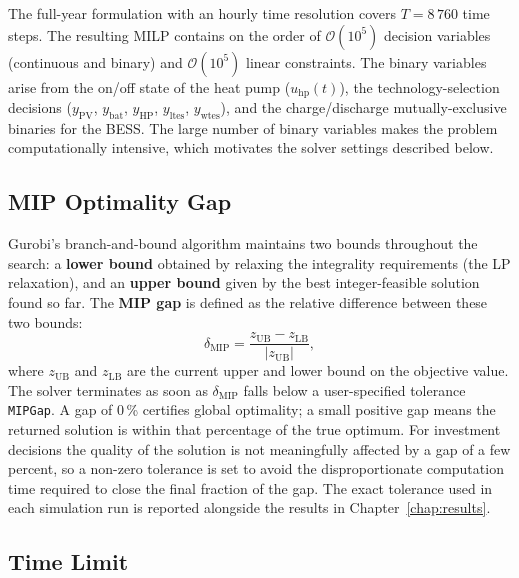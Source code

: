 \documentclass[11pt,a4paper]{report}
\begin{document}
The full-year formulation with an hourly time resolution covers $T = 8\,760$
time steps.
The resulting MILP contains on the order of $\mathcal{O}(10^5)$ decision
variables (continuous and binary) and $\mathcal{O}(10^5)$ linear constraints.
The binary variables arise from the on/off state of the heat pump ($u_\mathrm{hp}(t)$),
the technology-selection decisions ($y_\mathrm{PV}$, $y_\mathrm{bat}$,
$y_\mathrm{HP}$, $y_\mathrm{ltes}$, $y_\mathrm{wtes}$), and the
charge/discharge mutually-exclusive binaries for the BESS.
The large number of binary variables makes the problem computationally intensive,
which motivates the solver settings described below.

\subsection*{MIP Optimality Gap}

Gurobi's branch-and-bound algorithm maintains two bounds throughout the
search: a \textbf{lower bound} obtained by relaxing the integrality
requirements (the LP relaxation), and an \textbf{upper bound} given by the
best integer-feasible solution found so far.
The \textbf{MIP gap} is defined as the relative difference between these two
bounds:
\begin{equation}
    \delta_\mathrm{MIP}
    = \frac{z_\mathrm{UB} - z_\mathrm{LB}}{|z_\mathrm{UB}|},
    \label{eq:mip_gap}
\end{equation}
where $z_\mathrm{UB}$ and $z_\mathrm{LB}$ are the current upper and lower
bound on the objective value.
The solver terminates as soon as $\delta_\mathrm{MIP}$ falls below a
user-specified tolerance \texttt{MIPGap}.
A gap of 0\,\% certifies global optimality; a small positive gap means the
returned solution is within that percentage of the true optimum.
For investment decisions the quality of the solution is not meaningfully
affected by a gap of a few percent, so a non-zero tolerance is set to avoid
the disproportionate computation time required to close the final fraction of
the gap.
The exact tolerance used in each simulation run is reported alongside the
results in Chapter~\ref{chap:results}.

\subsection*{Time Limit}
\end{document}
